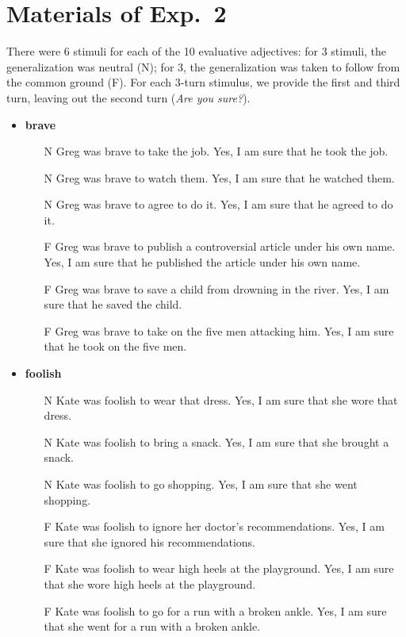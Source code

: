 \documentclass[11pt,fleqn]{article}
\newcommand{\6}{\mbox{$[\hspace*{-.6mm}[$}}
\newcommand{\9}{\mbox{$]\hspace*{-.6mm}]$}}
\begin{document}
\section{Materials of Exp.~2}\label{a-Exp2}

There were 6 stimuli for each of the 10 evaluative adjectives: for 3 stimuli, the generalization was neutral (N); for 3, the generalization was taken to follow from the common ground (F). For each 3-turn stimulus, we provide the first and third turn, leaving out the second turn ({\em Are you sure?}).

\begin{itemize}[itemsep=-1pt]

\item {\bf brave}

\begin{enumerate}[topsep=0pt,itemsep=-4pt]

\item[N]  	Greg was brave to take the job.	Yes, I am sure that he took the job.
\item[N]  	Greg was brave to watch them.	Yes, I am sure that he watched them.
\item[N]  	Greg was brave to agree to do it.	Yes, I am sure that he agreed to do it.
\item[F]  	Greg was brave to publish a controversial article under his own name.	Yes, I am sure that he published the article under his own name.
\item[F]  	Greg was brave to save a child from drowning in the river.	Yes, I am sure that he saved the child.
\item[F]  	Greg was brave to take on the five men attacking him.	Yes, I am sure that he took on the five men.

\end{enumerate}

\item {\bf foolish}

\begin{enumerate}[topsep=0pt,itemsep=-4pt]

\item[N]  	Kate was foolish to wear that dress.	Yes, I am sure that she wore that dress.
\item[N]  	Kate was foolish to bring a snack.	Yes, I am sure that she brought a snack.
\item[N]  	Kate was foolish to go shopping.	Yes, I am sure that she went shopping.
\item[F]  	Kate was foolish to ignore her doctor's recommendations.	Yes, I am sure that she ignored his recommendations.
\item[F]  	Kate was foolish to wear high heels at the playground.	Yes, I am sure that she wore high heels at the playground.
\item[F]  	Kate was foolish to go for a run with a broken ankle.	Yes, I am sure that she went for a run with a broken ankle.


\end{enumerate}
\end{itemize}
\end{document}
